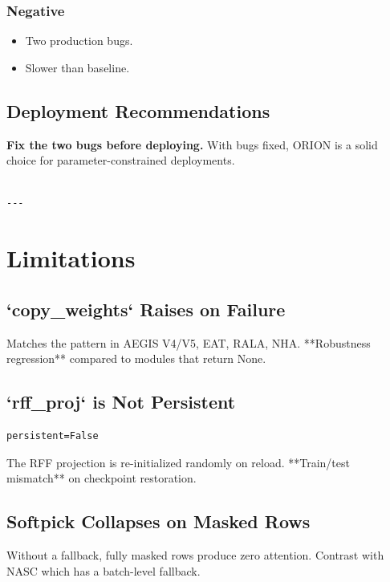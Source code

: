 \subsubsection{Negative}

\begin{itemize}
\item Two production bugs.
\item Slower than baseline.

\end{itemize}
\subsection{Deployment Recommendations}

\textbf{Fix the two bugs before deploying.} With bugs fixed, ORION is a solid 
choice for parameter-constrained deployments.
\begin{lstlisting}

---
\end{lstlisting}


\section{Limitations}

\subsection{`copy\_weights` Raises on Failure}

Matches the pattern in AEGIS V4/V5, EAT, RALA, NHA. **Robustness 
regression** compared to modules that return None.

\subsection{`rff\_proj` is Not Persistent}

\begin{lstlisting}
persistent=False
\end{lstlisting}

The RFF projection is re-initialized randomly on reload. **Train/test 
mismatch** on checkpoint restoration.

\subsection{Softpick Collapses on Masked Rows}

Without a fallback, fully masked rows produce zero attention. Contrast 
with NASC which has a batch-level fallback.

